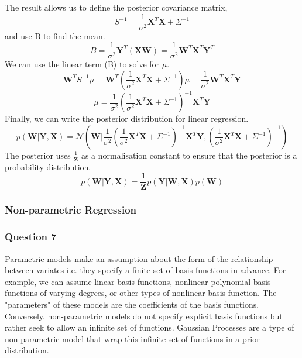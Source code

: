 \documentclass[10pt, a4paper, twocolumn]{article} %
\begin{document}
The result allows us to define the posterior covariance matrix,
\begin{equation*}
S^{-1} = \frac{1}{\sigma^{2}}\mathbf{X}^{T}\mathbf{X}+\Sigma^{-1}
\end{equation*}
and use B to find the mean. 
\begin{equation*}
B=\frac{1}{\sigma^{2}}\mathbf{Y}^T(\mathbf{XW}) = \frac{1}{\sigma^2}\mathbf{W}^T\mathbf{X}^T\mathbf{Y}^T
\end{equation*}
We can use the linear term (B) to solve for $\mu$.
\begin{equation*}
\mathbf{W}^TS^{-1}\mu = \mathbf{W}^{T}(\frac{1}{\sigma^2}\mathbf{X}^T\mathbf{X}+\Sigma^{-1})\mu=\frac{1}{\sigma^2}\mathbf{W}^T\mathbf{X}^T\mathbf{Y}
\end{equation*}
\begin{equation*}
\mu = \frac{1}{\sigma^2}(\frac{1}{\sigma^2}\mathbf{X}^T\mathbf{X}+\Sigma^{-1})^{-1}\mathbf{X}^{T}\mathbf{Y}
\end{equation*}
Finally, we can write the posterior distribution for linear regression.
\begin{equation}
p(\mathbf{W|Y,X}) = \mathcal{N}(\textbf{W}|\frac{1}{\sigma^2}(\frac{1}{\sigma^2}\mathbf{X}^T\mathbf{X}+\Sigma^{-1})^{-1}\mathbf{X}^T\mathbf{Y},(\frac{1}{\sigma^2}\mathbf{X}^T\mathbf{X}+\Sigma^{-1})^{-1})
\end{equation}
The posterior uses $\frac{1}{\mathbf{Z}}$ as a normalisation constant to ensure that the posterior is a probability distribution.
\begin{equation*}
p(\mathbf{W|Y, X}) = \frac{1}{\mathbf{Z}}p(\mathbf{Y|W,X})p(\mathbf{W})
\end{equation*}


\subsubsection{Non-parametric Regression}

\subsubsection*{Question 7}

Parametric models make an assumption about the form of the relationship between variates i.e. they specify a finite set of basis functions in advance. For example, we can assume linear basis functions, nonlinear polynomial basis functions of varying degrees, or other types of nonlinear basis function. The "parameters" of these models are the coefficients of the basis functions. Conversely, non-parametric models do not specify explicit basis functions but rather seek to allow an infinite set of functions. Gaussian Processes are a type of non-parametric model that wrap this infinite set of functions in a prior distribution.
\end{document}
